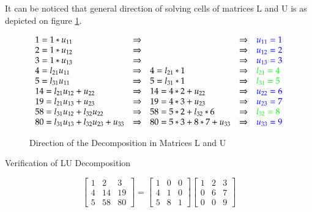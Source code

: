 It can be noticed that general direction of solving cells of matrices L and U is as depicted on figure \ref{fig:lu:direction}.

\begin{equation}
\begin{array}{lllll}
	1 = 1 * u_{11} & \Rightarrow & & \Rightarrow & \color{blue}{u_{11}} = 1 \\
	2 = 1 * u_{12} & \Rightarrow & & \Rightarrow & \color{blue}{u_{12}} = 2 \\
	3 = 1 * u_{13} & \Rightarrow & & \Rightarrow & \color{blue}{u_{13}} = 3 \\
	4 = l_{21}u_{11} & \Rightarrow & 4 = l_{21} * 1 & \Rightarrow & \color{green}{l_{21}} = 4 \\
	5 = l_{31}u_{11} & \Rightarrow & 5 = l_{31} * 1 & \Rightarrow & \color{green}{l_{31}} = 5 \\
	14 = l_{21}u_{12} + u_{22} & \Rightarrow & 14 = 4 * 2 + u_{22} & \Rightarrow & \color{blue}{u_{22}} = 6 \\
	19 = l_{21}u_{13} + u_{23} & \Rightarrow & 19 = 4 * 3 + u_{23} & \Rightarrow & \color{blue}{u_{23}} = 7 \\
	58 = l_{31}u_{12} + l_{32}u_{22} & \Rightarrow & 58 = 5 * 2 + l_{32} * 6 & \Rightarrow & \color{green}{l_{32}} = 8 \\
	80 = l_{31}u_{13} + l_{32}u_{23} + u_{33} & \Rightarrow & 80 = 5 * 3 + 8 * 7 + u_{33} & \Rightarrow & \color{blue}{u_{33}} = 9
\end{array}
\end{equation}

\begin{figure}[H]
\centering

\caption{Direction of the Decomposition in Matrices L and U}
\label{fig:lu:direction}
\end{figure}

Verification of LU Decomposition

\begin{equation}
\begin{bmatrix}
	1 & 2 & 3 \\
	4 & 14 & 19 \\
	5 & 58 & 80
\end{bmatrix}
=
\begin{bmatrix}
	1 & 0 & 0 \\
	4 & 1 & 0 \\
	5 & 8 & 1
\end{bmatrix}
\begin{bmatrix}
	1 & 2 & 3 \\
	0 & 6 & 7 \\
	0 & 0 & 9
\end{bmatrix}
\end{equation}

